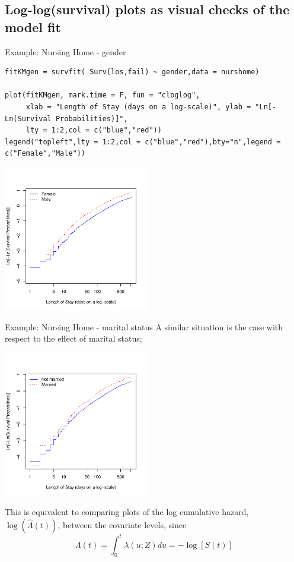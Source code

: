\documentclass[envcountsect, 10pt, portrait, palatino]{beamer}
\begin{document}
\subsection{Log-log(survival) plots as visual checks of the model fit}
\begin{frame}[fragile]{Example: Nursing Home - gender}

\scriptsize
\begin{verbatim}
fitKMgen = survfit( Surv(los,fail) ~ gender,data = nurshome)

plot(fitKMgen, mark.time = F, fun = "cloglog",
     xlab = "Length of Stay (days on a log-scale)", ylab = "Ln[-Ln(Survival Probabilities)]",
     lty = 1:2,col = c("blue","red"))
legend("topleft",lty = 1:2,col = c("blue","red"),bty="n",legend = c("Female","Male"))
\end{verbatim}
\vspace*{-.25in}
\centerline{\includegraphics[width=2.5in]{ch12ph_sex.pdf}}
\normalsize
\end{frame}
\begin{frame}{Example: Nursing Home - marital status}
A similar situation is the case with respect to the effect of marital status;
~\\[-1ex]
\vspace*{-.25in}
\centerline{\includegraphics[width=2.5in]{ch12ph_mar_status.pdf}}
This is equivalent to comparing plots of the log cumulative
hazard, $\log(\hat\Lambda(t))$, between the covariate levels, since
\[ \Lambda(t) =  \int_0^t \lambda(u; Z)du = -\log[S(t)]   \]
\end{frame}
\end{document}
